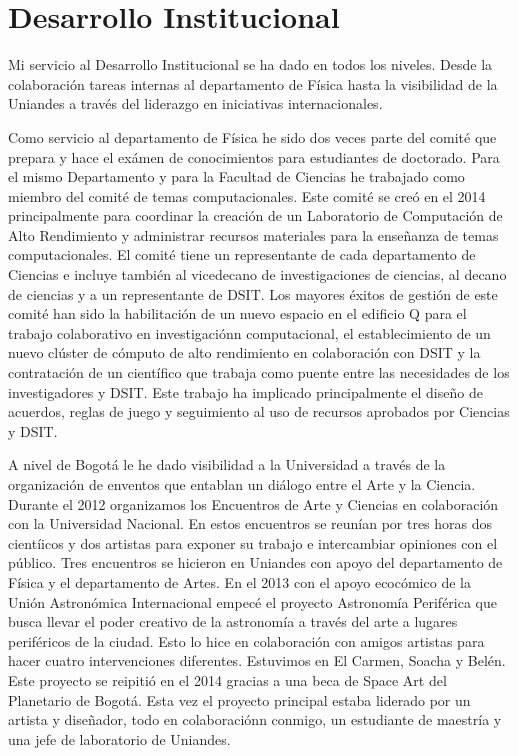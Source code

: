 \documentclass[letterpaper,12pt,onecolumn]{article}
\begin{document}
\section{{\Large{\sc Desarrollo Institucional}}}

Mi servicio al Desarrollo Institucional se ha dado en todos los
niveles. Desde la colaboraci\'on tareas internas al departamento de
F\'isica hasta la visibilidad de la Uniandes a trav\'es del liderazgo
en iniciativas internacionales. 

Como servicio al departamento de F\'isica he sido dos veces parte del
comit\'e que prepara y hace el ex\'amen de conocimientos para estudiantes
de doctorado.  Para el mismo Departamento y para la Facultad de
Ciencias he trabajado como miembro del comit\'e de temas
computacionales. Este comit\'e se cre\'o en el 2014 principalmente
para coordinar la creaci\'on de un Laboratorio de Computaci\'on de
Alto Rendimiento y administrar recursos materiales para la ense\~nanza
de temas computacionales. El comit\'e tiene un representante de cada
departamento de Ciencias e incluye tambi\'en al vicedecano de
investigaciones de ciencias, al decano de ciencias y a un
representante de DSIT. Los mayores \'exitos de gesti\'on de este
comit\'e han sido la habilitaci\'on de un nuevo espacio en el edificio
Q para el trabajo colaborativo en investigaci\'onn computacional, el
establecimiento de un nuevo cl\'uster de c\'omputo de alto rendimiento en
colaboraci\'on con DSIT y la contrataci\'on de un cient\'ifico que trabaja
como puente entre las necesidades de los investigadores y DSIT. Este
trabajo ha implicado principalmente el dise\~no de acuerdos, reglas de
juego y seguimiento al uso de recursos aprobados por Ciencias y DSIT.

A nivel de Bogot\'a le he dado visibilidad a la Universidad a trav\'es de
la organizaci\'on de enventos que entablan un di\'alogo entre el Arte
y la Ciencia. Durante el 2012 organizamos los Encuentros de Arte y
Ciencias en colaboraci\'on con la Universidad Nacional. En estos
encuentros se reun\'ian por tres horas dos cient\'iicos y dos artistas
para exponer su trabajo e intercambiar opiniones con el
p\'ublico. Tres encuentros se hicieron en Uniandes con apoyo del
departamento de F\'isica y el departamento de Artes. 
En el 2013 con el apoyo ecoc\'omico de la Uni\'on Astron\'omica
Internacional empec\'e el proyecto Astronom\'ia Perif\'erica que busca
llevar el poder creativo de la astronom\'ia a trav\'es del arte a lugares
perif\'ericos de la ciudad. Esto lo hice en colaboraci\'on con amigos
artistas para hacer cuatro intervenciones diferentes. Estuvimos en El
Carmen, Soacha y Bel\'en. Este proyecto se reipiti\'o en el 2014 gracias a
una beca de Space Art del Planetario de Bogot\'a. Esta vez el proyecto
principal estaba liderado por un artista y dise\~nador, todo en
colaboraci\'onn conmigo,  un estudiante de maestr\'ia y una jefe de
laboratorio de Uniandes.
\end{document}
